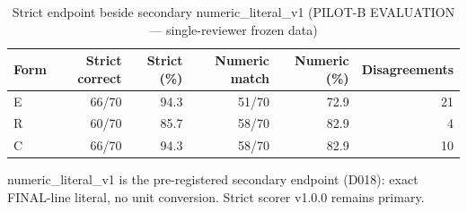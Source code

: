 \begin{table}[t]
\centering
\small
\caption{Strict endpoint beside secondary numeric\_literal\_v1 (PILOT-B EVALUATION --- single-reviewer frozen data)}
\label{tab:pilotb-Qwen3-4B-numeric}
\begin{tabular}{lrrrrr}
\toprule
Form & Strict correct & Strict (\%) & Numeric match & Numeric (\%) & Disagreements \\
\midrule
E & 66/70 & 94.3 & 51/70 & 72.9 & 21 \\
R & 60/70 & 85.7 & 58/70 & 82.9 & 4 \\
C & 66/70 & 94.3 & 58/70 & 82.9 & 10 \\
\bottomrule
\end{tabular}
\par\smallskip
\parbox{\linewidth}{\footnotesize numeric\_literal\_v1 is the pre-registered secondary endpoint (D018): exact FINAL-line literal, no unit conversion. Strict scorer v1.0.0 remains primary.}
\end{table}
